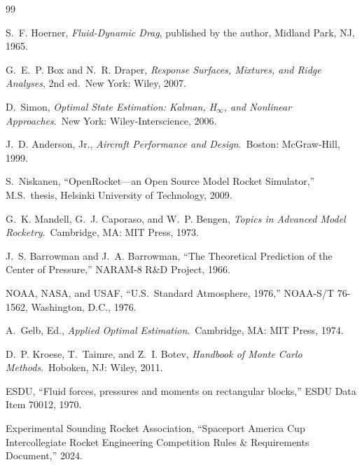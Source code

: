 \documentclass[11pt,letterpaper]{article}
\begin{document}
\begin{thebibliography}{99}

S.~F. Hoerner, \textit{Fluid-Dynamic Drag}, published by the author, Midland Park, NJ, 1965.

G.~E.~P. Box and N.~R. Draper, \textit{Response Surfaces, Mixtures, and Ridge Analyses}, 2nd ed.\ New York: Wiley, 2007.

D.~Simon, \textit{Optimal State Estimation: Kalman, H$_\infty$, and Nonlinear Approaches}.\ New York: Wiley-Interscience, 2006.

J.~D. Anderson, Jr., \textit{Aircraft Performance and Design}.\ Boston: McGraw-Hill, 1999.

S.~Niskanen, ``OpenRocket---an Open Source Model Rocket Simulator,'' M.S.\ thesis, Helsinki University of Technology, 2009.

G.~K. Mandell, G.~J. Caporaso, and W.~P. Bengen, \textit{Topics in Advanced Model Rocketry}.\ Cambridge, MA: MIT Press, 1973.

J.~S. Barrowman and J.~A. Barrowman, ``The Theoretical Prediction of the Center of Pressure,'' NARAM-8 R\&D Project, 1966.


NOAA, NASA, and USAF, ``U.S.\ Standard Atmosphere, 1976,'' NOAA-S/T 76-1562, Washington, D.C., 1976.

A.~Gelb, Ed., \textit{Applied Optimal Estimation}.\ Cambridge, MA: MIT Press, 1974.

D.~P. Kroese, T.~Taimre, and Z.~I. Botev, \textit{Handbook of Monte Carlo Methods}.\ Hoboken, NJ: Wiley, 2011.

ESDU, ``Fluid forces, pressures and moments on rectangular blocks,'' ESDU Data Item 70012, 1970.

Experimental Sounding Rocket Association, ``Spaceport America Cup Intercollegiate Rocket Engineering Competition Rules \& Requirements Document,'' 2024.

\end{thebibliography}
\end{document}
